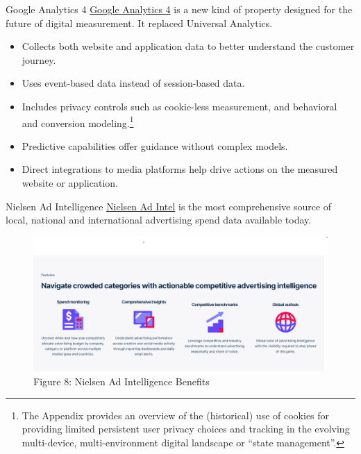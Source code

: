 \documentclass[pdf]{beamer}
\theoremstyle{remark}
\theoremstyle{definition}
\begin{document}
\begin{frame}[t]{Google Analytics 4}
\href{https://support.google.com/analytics/answer/10089681?hl=en}{Google Analytics 4} is a new kind of property designed for the future of digital measurement.  It replaced Universal Analytics. \\
\vspace{1.5ex}
\begin{itemize}
\item Collects both website and application data to better understand the customer journey.
\item Uses event-based data instead of session-based data.
\item Includes privacy controls such as cookie-less measurement, and behavioral and conversion modeling.\footnote{The Appendix provides an overview of the (historical) use of cookies for providing limited persistent user privacy choices and tracking in the evolving multi-device, multi-environment
digital landscape or ``state management''.}
\item Predictive capabilities offer guidance without complex models.
\item Direct integrations to media platforms help drive actions on the measured website or application.
\end{itemize}
\end{frame}

\begin{frame}[t]{Nielsen Ad Intelligence}
\href{https://www.nielsen.com/solutions/media-planning/ad-intelligence/?gclid=Cj0KCQiA4OybBhCzARIsAIcfn9mptPSPlhWwtKcR07kqOhwDHAjAxI0tc_CecLGS0xyp-ag17ENm02caAvAJEALw_wcB&gclsrc=aw.ds}{Nielsen Ad Intel} is the most comprehensive source of local, national and international advertising spend data available today. \\
\vspace{-2.0ex}
\begin{figure}[htbp]
    \centering
    \captionsetup{justification=centering}
    \includegraphics[clip, trim=0.0cm 0.0cm 0.0cm 0.0cm, width=1\textwidth]{Images/Nielsen_Ad_Intel.png}  
    \caption{Figure {\color{franklinblue} 8}:  Nielsen Ad Intelligence Benefits}
    \label{fig:nielsenadintel}
\end{figure} 
\end{frame}
\end{document}
